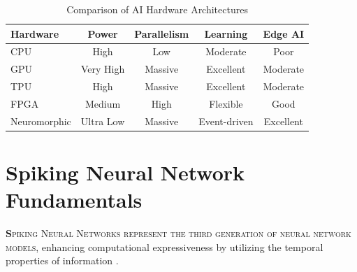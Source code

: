 \documentclass[11pt]{article}
\newcommand{\sectionlead}[2]{\noindent\lettrine[lines=2,lhang=0.08,nindent=0.12em]{\textcolor{IEEEblue}{\bfseries #1}}{\hspace{0.03em}#2}}
\begin{document}
\begin{table}[htbp]
    \centering
    \caption{Comparison of AI Hardware Architectures}
    \begin{tabular}{lcccc}
        \toprule
        \textbf{Hardware} & \textbf{Power} & \textbf{Parallelism} & \textbf{Learning} & \textbf{Edge AI} \\
        \midrule
        CPU & High & Low & Moderate & Poor \\
        GPU & Very High & Massive & Excellent & Moderate \\
        TPU & High & Massive & Excellent & Moderate \\
        FPGA & Medium & High & Flexible & Good \\
        Neuromorphic & Ultra Low & Massive & Event-driven & Excellent \\
        \bottomrule
    \end{tabular}
    \label{tab:ai_hardware_comparison}
\end{table}

\section{Spiking Neural Network Fundamentals}
\sectionlead{S}{piking Neural Networks represent the third generation of neural network models}, enhancing computational expressiveness by utilizing the temporal properties of information \cite{schuman2017survey}.
\end{document}
